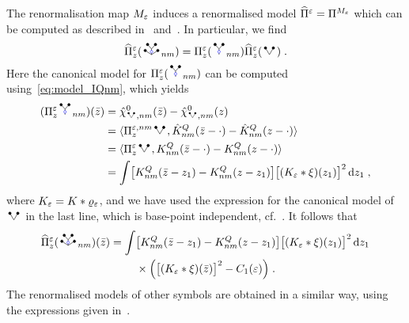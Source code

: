 \documentclass[reqno,11pt]{article}
\def\KQhat{\hat K^Q}
\newcommand{\smallRSV}{\scalebox{0.7}{\RSV}}
\begin{document}
The renormalisation map $M_\varepsilon$ induces a renormalised model 
$\widehat\Pi^\varepsilon=\Pi^{M_\varepsilon}$ which can be computed as described 
in~\cite[Sect.~8.3]{Hairer2014} 
and~\cite[Sect.~6.1]{BK2016}. In particular, we find 
\begin{equation}
 \widehat\Pi^\eps_z(\RSoWV_{nm}) 
 = \Pi^\eps_z(\RSoY_{nm}) \widehat\Pi^\eps_z(\RSV)\;. 
\end{equation} 
Here the canonical model for $\Pi^\eps_z(\RSoY_{nm})$ can be computed 
using~\eqref{eq:model_IQnm}, which yields  
\begin{align}
\nonumber
(\Pi^\eps_z \RSoY_{nm})(\bar z) 
&= \hat\chi^0_{\smallRSV,nm}(\bar z) - \hat\chi^0_{\smallRSV,nm}(z) \\
\nonumber
&= \pscal{\Pi^{\eps,nm}_z\RSV}{\KQhat_{nm}(\bar z-\cdot) - 
\KQhat_{nm}(z-\cdot)} \\
\nonumber
&= \pscal{\Pi^{\eps}_z\RSV}{K^Q_{nm}(\bar z-\cdot) - 
K^Q_{nm}(z-\cdot)} \\
&= \int \bigbrak{K^Q_{nm}(\bar z-z_1) - K^Q_{nm}(z-z_1)} 
\bigbrak{(K_\eps * \xi)(z_1)}^2 \6z_1\;,
\end{align}
where $K_\varepsilon = K * \varrho_\varepsilon$, and we have used the 
expression for the canonical model of $\RSV$ in the last line, 
which is base-point independent, cf.~\cite[(6.28)]{BK2016}. It 
follows that 
\begin{align}
\nonumber
  \widehat\Pi^\eps_z(\RSoWV_{nm})(\bar z)
  = \int & \bigbrak{K^Q_{nm}(\bar z-z_1) - K^Q_{nm}(z-z_1)} 
\bigbrak{(K_\eps * \xi)(z_1)}^2 \6z_1 \\
& \times \Bigpar{\bigbrak{(K_\eps * \xi)(\bar z)}^2 - C_1(\eps)}\;.
\end{align} 
The renormalised models of other symbols are obtained in a similar way, using 
the expressions given in~\cite[(6.13)]{BK2016}. 
\end{document}
